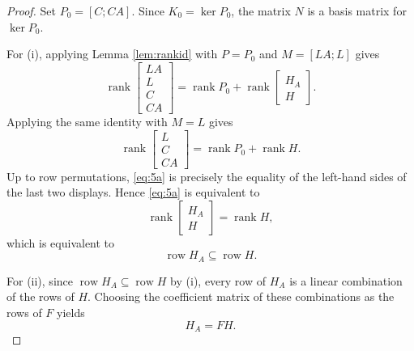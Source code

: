 \documentclass[journal]{IEEEtran}
\theoremstyle{plainn}
\theoremstyle{remark}
\begin{document}
\begin{proof}
	Set $P_0=[C;CA]$. Since $K_0=\ker P_0$, the matrix $N$ is a basis matrix for $\ker P_0$.
	
	For (i), applying Lemma \ref{lem:rankid} with
	$P=P_0$ and $M=[LA;L]$ gives
	\begin{equation*}
	\operatorname{rank}\begin{bmatrix}LA\\ L\\ C\\ CA\end{bmatrix}
	=
	\operatorname{rank}P_0+\operatorname{rank}\begin{bmatrix}H_A\\ H\end{bmatrix}.
	\end{equation*}
	Applying the same identity with $M=L$ gives
	\begin{equation*}
	\operatorname{rank}\begin{bmatrix}L\\ C\\ CA\end{bmatrix}
	=
	\operatorname{rank}P_0+\operatorname{rank}H.
	\end{equation*}
	Up to row permutations, \eqref{eq:5a} is precisely the equality of the left-hand sides of the last two displays. Hence \eqref{eq:5a} is equivalent to
	\begin{equation}
	\operatorname{rank}\begin{bmatrix}H_A\\ H\end{bmatrix}
	=\operatorname{rank}H,
	\end{equation}
	which is equivalent to
	\begin{equation}\label{eq:5a-1}
		\operatorname{row}H_A\subseteq\operatorname{row}H.
	\end{equation}
	
	For (ii), since $\operatorname{row}H_A\subseteq\operatorname{row}H$ by (i), every row of $H_A$ is a linear combination of the rows of $H$. Choosing the
	coefficient matrix of these combinations as the rows of $F$ yields 
	\begin{equation}\label{eq:5a-2}
		H_A=FH.
	\end{equation}
	

\end{proof}
\end{document}
